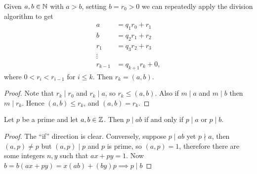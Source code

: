 \documentclass[a4paper, 10pt]{amsart}
\begin{document}


\begin{theorem}
Given $a, b\in \mathbb{N}$ with $a > b$, setting $b = r_0>0$ we can repeatedly apply the division algorithm to get
\begin{align*}
  a &= q_1 r_0 + r_1 \\
  b &= q_2 r_1 + r_2 \\
  r_1 &= q_3 r_2 + r_3 \\
  \vdots \\
  r_{k-1} &= q_{k+1} r_{k} + 0,
\end{align*}
where $0 < r_i < r_{i - 1}$ for $i \leq k$.
Then $r_k = (a, b)$.
\end{theorem}
\begin{proof}
  Note that $r_k \mid r_0$ and $r_k \mid a$, so $r_k \leq (a, b)$. Also if $m \mid a$ and $m \mid b$ then $m\mid r_k$. Hence $(a, b) \leq r_k$, and $(a, b) = r_k$.
\end{proof}

\begin{lemma}
  Let $p$ be a prime and let $a, b\in \mathbb{Z}$. Then $p \mid ab$ if and only if $p \mid a$ or $p \mid b$.
\end{lemma}
\begin{proof}
  The ``if'' direction is clear. Conversely, suppose $p \mid a b$ yet $p \nmid a$, then $(a, p) \neq p$ but $(a, p) \mid p$ and $p$ is prime, so $(a, p)=1$, therefore there are some integers $n, y$ such that $a x+p y=1$. Now $b=b(a x+p y)=x(a b)+(b y) p \implies p \mid b$
\end{proof}
\end{document}
